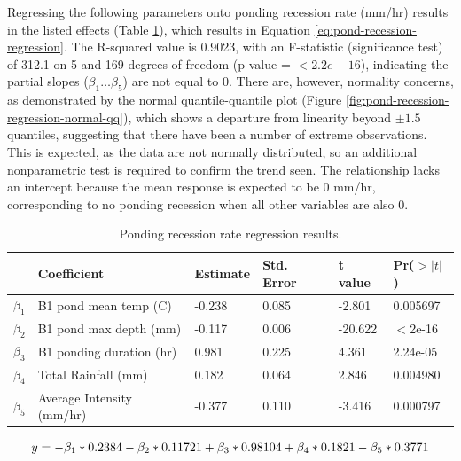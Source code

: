 Regressing the following parameters onto ponding recession rate (mm/hr) results in the listed effects (Table \ref{table:pond-recession-regression}), which results in Equation \ref{eq:pond-recession-regression}.
The R-squared value is 0.9023, with an F-statistic (significance test) of 312.1 on 5 and 169 degrees of freedom (p-value = $<2.2e-16$), indicating the partial slopes ($\beta_1\dots\beta_5$) are not equal to 0.
There are, however, normality concerns, as demonstrated by the normal quantile-quantile plot (Figure \ref{fig:pond-recession-regression-normal-qq}), which shows a departure from linearity beyond $\pm1.5$ quantiles, suggesting that there have been a number of extreme observations.
This is expected, as the data are not normally distributed, so an additional nonparametric test is required to confirm the trend seen.
The relationship lacks an intercept because the mean response is expected to be 0 mm/hr, corresponding to no ponding recession when all other variables are also 0.

\begin{table}[ht!]
\centering
\caption{Ponding recession rate regression results.}
	\begin{tabular}{|l|l|l|l|l|l|}
		\hline
		& Coefficient & Estimate & Std. Error & t value & Pr($>|t|$) \\
		\hline
		$\beta_{1}$ & B1 pond mean temp (\degree C)  & -0.238 & 0.085 & -2.801 & 0.005697 \\
		$\beta_{2}$ & B1 pond max depth (mm)         & -0.117 & 0.006 &-20.622 & $<$2e-16 \\
		$\beta_{3}$ & B1 ponding duration (hr)       &  0.981 & 0.225 &  4.361 & 2.24e-05 \\
		$\beta_{4}$ & Total Rainfall (mm)            &  0.182 & 0.064 &  2.846 & 0.004980 \\
		$\beta_{5}$ & Average Intensity (mm/hr)      & -0.377 & 0.110 & -3.416 & 0.000797 \\
		\hline
	\end{tabular}
\label{table:pond-recession-regression}
\end{table}

\begin{equation}
	\centering
	y = - \beta_1 * 0.2384 - \beta_2 * 0.11721 + \beta_3 * 0.98104 + \beta_4 * 0.1821 - \beta_5 * 0.3771
	\label{eq:pond-recession-regression}
\end{equation}

